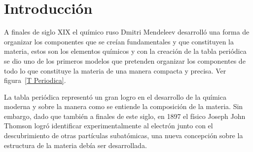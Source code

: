 \documentclass[journal]{IEEEtran}
\begin{document}
\section{Introducción}

A finales de siglo XIX el químico ruso Dmitri Mendeleev desarrolló una forma de organizar los componentes que se creían fundamentales y que constituyen la materia, estos son los elementos químicos y con la creación de la tabla periódica se dio uno de los primeros modelos que pretenden organizar los componentes de todo lo que constituye la materia de una manera compacta y precisa. Ver figura~\ref{T Periodica}.

La tabla periódica representó un gran logro en el desarrollo de la química moderna y sobre la manera como se entiende la composición de la materia. Sin embargo, dado que también a finales de este siglo, en 1897 el físico Joseph John Thomson logró identificar experimentalmente al electrón junto con el descubrimiento de otras partículas subatómicas, una nueva concepción sobre la estructura de la materia debía ser desarrollada. 
\end{document}
